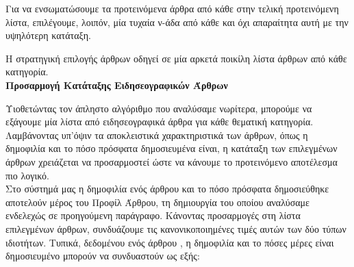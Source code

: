 {{{{{{{{Για να ενσωματώσουμε τα προτεινόμενα άρθρα από κάθε {} στην τελική προτεινόμενη λίστα, 
επιλέγουμε, λοιπόν, μία τυχαία ν-άδα από κάθε {} και όχι απαραίτητα αυτή με την υψηλότερη κατάταξη.

Η {} στρατηγική επιλογής άρθρων οδηγεί σε μία αρκετά ποικίλη λίστα άρθρων από κάθε κατηγορία. \\
 
\textbf{Προσαρμογή Κατάταξης Ειδησεογραφικών Άρθρων} 

Υιοθετώντας τον άπληστο αλγόριθμο που αναλύσαμε νωρίτερα, 
μπορούμε να εξάγουμε μία λίστα από ειδησεογραφικά άρθρα για κάθε θεματική κατηγορία. 
Λαμβάνοντας υπ'όψιν τα αποκλειστικά χαρακτηριστικά των άρθρων, όπως η δημοφιλία και το 
πόσο πρόσφατα δημοσιευμένα είναι, η κατάταξη των επιλεγμένων άρθρων χρειάζεται να προσαρμοστεί 
ώστε να κάνουμε το προτεινόμενο αποτέλεσμα πιο λογικό. \\

Στο σύστημά μας η δημοφιλία ενός άρθρου και το πόσο πρόσφατα δημοσιεύθηκε αποτελούν μέρος του Προφίλ Άρθρου, 
τη δημιουργία του οποίου αναλύσαμε ενδελεχώς σε προηγούμενη παράγραφο. 
Κάνοντας προσαρμογές στη λίστα επιλεγμένων άρθρων, συνδυάζουμε τις κανονικοποιημένες τιμές 
αυτών των δύο τύπων ιδιοτήτων. Τυπικά, δεδομένου ενός άρθρου {}, 
η δημοφιλία {} και το πόσες μέρες είναι δημοσιευμένο {} 
μπορούν να συνδυαστούν ως εξής: 

}}}}}}}}
